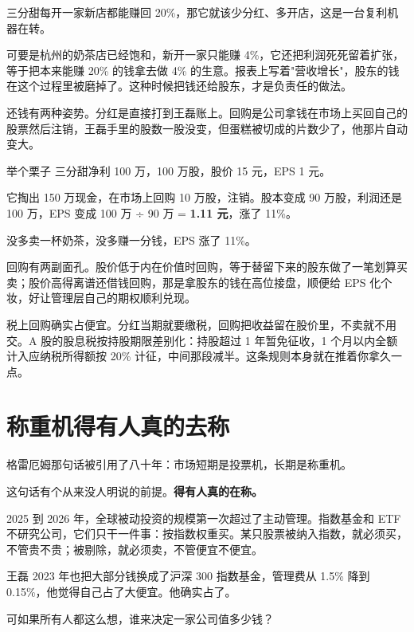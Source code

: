 三分甜每开一家新店都能赚回 20\%，那它就该少分红、多开店，这是一台复利机器在转。

可要是杭州的奶茶店已经饱和，新开一家只能赚 4\%，它还把利润死死留着扩张，等于把本来能赚 20\% 的钱拿去做 4\% 的生意。报表上写着"营收增长"，股东的钱在这个过程里被磨掉了。这种时候把钱还给股东，才是负责任的做法。

还钱有两种姿势。分红是直接打到王磊账上。回购是公司拿钱在市场上买回自己的股票然后注销，王磊手里的股数一股没变，但蛋糕被切成的片数少了，他那片自动变大。

\begin{egbox}{举个栗子}
三分甜净利 100 万，100 万股，股价 15 元，EPS 1 元。

它掏出 150 万现金，在市场上回购 10 万股，注销。股本变成 90 万股，利润还是 100 万，EPS 变成 100 万 ÷ 90 万 = \textbf{1.11 元}，涨了 11\%。

没多卖一杯奶茶，没多赚一分钱，EPS 涨了 11\%。

\end{egbox}

回购有两副面孔。股价低于内在价值时回购，等于替留下来的股东做了一笔划算买卖；股价高得离谱还借钱回购，那是拿股东的钱在高位接盘，顺便给 EPS 化个妆，好让管理层自己的期权顺利兑现。

税上回购确实占便宜。分红当期就要缴税，回购把收益留在股价里，不卖就不用交。A 股的股息税按持股期限差别化：持股超过 1 年暂免征收，1 个月以内全额计入应纳税所得额按 20\% 计征，中间那段减半。这条规则本身就在推着你拿久一点。

\section{称重机得有人真的去称}

格雷厄姆那句话被引用了八十年：市场短期是投票机，长期是称重机。

这句话有个从来没人明说的前提。\textbf{得有人真的在称。}

2025 到 2026 年，全球被动投资的规模第一次超过了主动管理。指数基金和 ETF 不研究公司，它们只干一件事：按指数权重买。某只股票被纳入指数，就必须买，不管贵不贵；被剔除，就必须卖，不管便宜不便宜。

王磊 2023 年也把大部分钱换成了沪深 300 指数基金，管理费从 1.5\% 降到 0.15\%，他觉得自己占了大便宜。他确实占了。

可如果所有人都这么想，谁来决定一家公司值多少钱？

